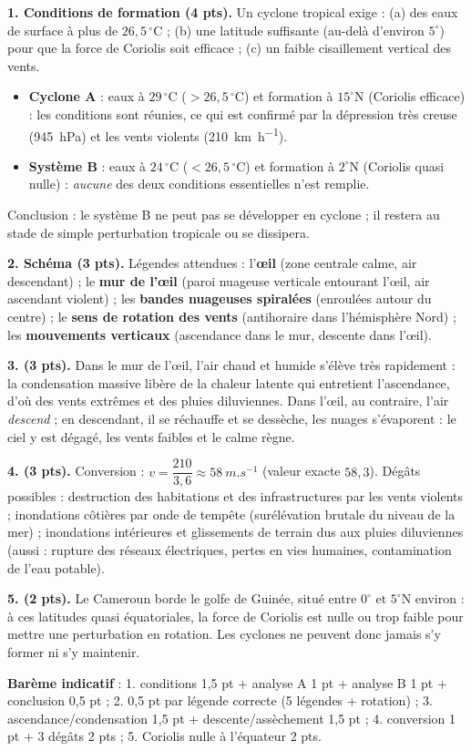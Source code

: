 \documentclass[11pt]{article}
\begin{document}
\begin{corrige}
\textbf{1. Conditions de formation (4 pts).} Un cyclone tropical exige : (a) des eaux de surface à plus de $26,5\,^\circ$C ; (b) une latitude suffisante (au-delà d'environ $5^\circ$) pour que la force de Coriolis soit efficace ; (c) un faible cisaillement vertical des vents.
\begin{itemize}
\item \textbf{Cyclone A} : eaux à $29\,^\circ$C ($> 26,5\,^\circ$C) et formation à $15^\circ$N (Coriolis efficace) : les conditions sont réunies, ce qui est confirmé par la dépression très creuse (\SI{945}{hPa}) et les vents violents (\SI{210}{km.h^{-1}}).
\item \textbf{Système B} : eaux à $24\,^\circ$C ($< 26,5\,^\circ$C) et formation à $2^\circ$N (Coriolis quasi nulle) : \emph{aucune} des deux conditions essentielles n'est remplie.
\end{itemize}
Conclusion : le système B ne peut pas se développer en cyclone ; il restera au stade de simple perturbation tropicale ou se dissipera.

\textbf{2. Schéma (3 pts).} Légendes attendues : l'\textbf{\oe il} (zone centrale calme, air descendant) ; le \textbf{mur de l'\oe il} (paroi nuageuse verticale entourant l'\oe il, air ascendant violent) ; les \textbf{bandes nuageuses spiralées} (enroulées autour du centre) ; le \textbf{sens de rotation des vents} (antihoraire dans l'hémisphère Nord) ; les \textbf{mouvements verticaux} (ascendance dans le mur, descente dans l'\oe il).

\textbf{3. (3 pts).} Dans le mur de l'\oe il, l'air chaud et humide s'élève très rapidement : la condensation massive libère de la chaleur latente qui entretient l'ascendance, d'où des vents extrêmes et des pluies diluviennes. Dans l'\oe il, au contraire, l'air \emph{descend} ; en descendant, il se réchauffe et se dessèche, les nuages s'évaporent : le ciel y est dégagé, les vents faibles et le calme règne.

\textbf{4. (3 pts).} Conversion : $v = \dfrac{210}{3,6} \approx \SI{58}{m.s^{-1}}$ (valeur exacte $58,3$). Dégâts possibles : destruction des habitations et des infrastructures par les vents violents ; inondations côtières par onde de tempête (surélévation brutale du niveau de la mer) ; inondations intérieures et glissements de terrain dus aux pluies diluviennes (aussi : rupture des réseaux électriques, pertes en vies humaines, contamination de l'eau potable).

\textbf{5. (2 pts).} Le Cameroun borde le golfe de Guinée, situé entre $0^\circ$ et $5^\circ$N environ : à ces latitudes quasi équatoriales, la force de Coriolis est nulle ou trop faible pour mettre une perturbation en rotation. Les cyclones ne peuvent donc jamais s'y former ni s'y maintenir.

\textbf{Barème indicatif} : 1. conditions 1,5 pt + analyse A 1 pt + analyse B 1 pt + conclusion 0,5 pt ; 2. 0,5 pt par légende correcte (5 légendes + rotation) ; 3. ascendance/condensation 1,5 pt + descente/assèchement 1,5 pt ; 4. conversion 1 pt + 3 dégâts 2 pts ; 5. Coriolis nulle à l'équateur 2 pts.
\end{corrige}
\end{document}
